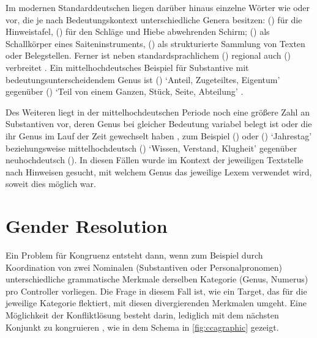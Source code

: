 Im modernen Standarddeutschen liegen darüber hinaus einzelne Wörter wie
 oder  vor, die je nach Bedeutungskontext
unterschiedliche Genera besitzen:  (\NeutI) für die
Hinweistafel,  (\MascI) für den Schläge und Hiebe abwehrenden
Schirm;  (\MascI) als Schallkörper eines Saiteninstruments,
 (\NeutI) als strukturierte Sammlung von Texten oder
Belegstellen. Ferner ist neben standardsprachlichem  (\FemI)
regional auch  (\MascI) verbreitet
\autocite[s.\,v.~\textit{der/die Butter}]{elspassmoeller2003}. Ein
mittelhochdeutsches Beispiel für Substantive mit bedeutungs\-unterscheidendem
Genus ist  (\MascI) `Anteil, Zugeteiltes, Eigentum' gegenüber
 (\NeutI) `Teil von einem Ganzen, Stück, Seite, Abteilung'
\autocite[s.\,v.~\textit{teil}]{lexer:mhdhwb}.

Des Weiteren liegt in der mittelhochdeutschen Periode noch eine größere Zahl an
Substantiven vor, deren Genus bei gleicher Bedeutung variabel belegt ist oder
die ihr Genus im Lauf der Zeit gewechselt haben \autocite[157--166]{ksw2}, zum
Beispiel  (\FemI) oder  (\NeutI) `Jahrestag'
beziehungsweise mittel\-hoch\-deutsch  (\FemI) `Wissen, Verstand,
Klugheit' \autocite[vgl.][s.\,v.~\textit{witze}]{lexer:mhdhwb} gegenüber
neu\-hoch\-deutsch  (\MascI). In diesen Fällen wurde im Kontext
der jeweiligen Textstelle nach Hinweisen gesucht, mit welchem Genus das
jeweilige Lexem verwendet wird, soweit dies möglich war.

\section{Gender Resolution}
\label{sec:gendres}

Ein Problem für Kongruenz entsteht dann, wenn zum Beispiel durch Koordination
von zwei Nominalen (Substantiven oder Personalpronomen) unterschiedliche
grammatische Merkmale derselben Kategorie (Genus, Numerus) pro Controller
vorliegen. Die Frage in diesem Fall ist, wie ein Target, das für die jeweilige
Kategorie flektiert, mit diesen divergierenden Merkmalen umgeht. Eine
Möglichkeit der Konfliktlösung besteht darin, lediglich mit dem nächsten
Konjunkt zu kongruieren \autocites[;
vgl.][179--180]{corbett1983}[168--170]{corbett2006}, wie in dem Schema in
\cref{fig:ccagraphic} gezeigt.

